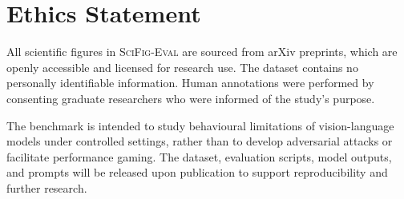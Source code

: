 \section*{Ethics Statement}

All scientific figures in \textsc{SciFig-Eval} are sourced from arXiv preprints, which are openly accessible and licensed for research use. The dataset contains no personally identifiable information. Human annotations were performed by consenting graduate researchers who were informed of the study's purpose. %

The benchmark is intended to study behavioural limitations of vision-language models under controlled settings, rather than to develop adversarial attacks or facilitate performance gaming. The dataset, evaluation scripts, model outputs, and prompts will be released upon publication to support reproducibility and further research.